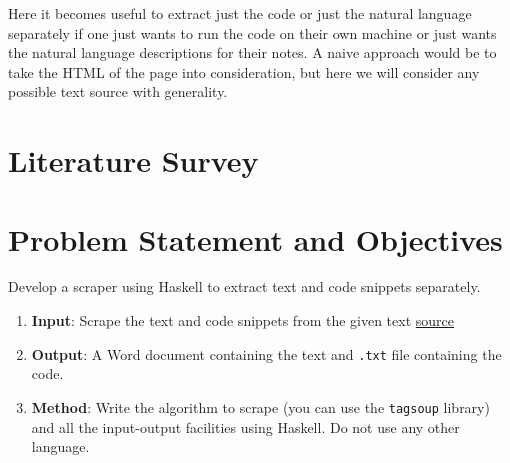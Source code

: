 \documentclass{scrreprt}
\begin{document}
Here it becomes useful to extract just the code or just the natural language separately if one just wants to run the code on their own machine or just wants the natural language descriptions for their notes. A naive approach would be to take the HTML of the page into consideration, but here we will consider any possible text source with generality. 


\chapter{Literature Survey}









\chapter{Problem Statement and Objectives}
\begin{tcolorbox}[colback=white,colframe=gray,title={Assigned Project Statement}]
    Develop a scraper using Haskell to extract text and code snippets separately.
    \begin{enumerate}
        \item \textbf{Input}: Scrape the text and code snippets from the given text \href{https://eli.thegreenplace.net/2018/type-erasure-and-reification/}{source}
        \item \textbf{Output}: A Word document containing the text and \texttt{.txt} file containing the code.
        \item \textbf{Method}: Write the algorithm to scrape (you can use the \texttt{tagsoup} library) and all the input-output facilities using Haskell. Do not use any other language.
    \end{enumerate}
\end{tcolorbox}


\end{document}
